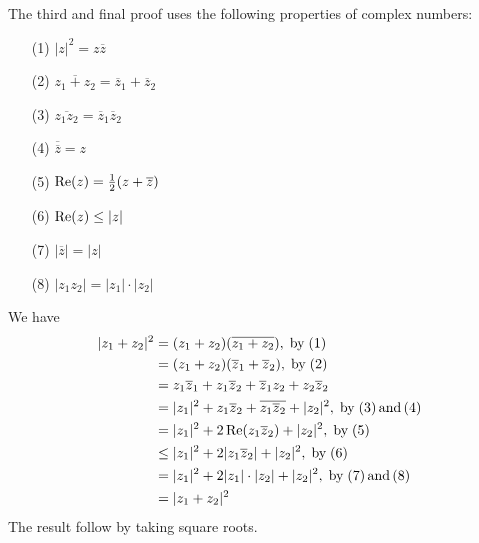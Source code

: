 \documentclass[handout]{ximera}
\begin{document}
The third and final proof uses the following properties of complex numbers:


\begin{itemize}
\item[(1)] $|z|^2 = z{\overline z} $
\item[(2)] ${\overline {z_1 + z_2}}= {\overline z_1} +{\overline z_2} $
\item[(3)] ${\overline{z_1z_2}} = {\overline z_1} {\overline z_2}$
\item[(4)] ${\overline {\overline z}} = z $
\item[(5)]  $\operatorname{Re}(z) = \frac12 (z+{\overline z}) $
\item[(6)]  $\operatorname{Re}(z) \leq |z| $
\item[(7)] $|{\overline z}| = |z|$ 
\item[(8)] $|z_1z_2| = |z_1|\cdot |z_2|$
\end{itemize}

We have
\begin{align*}
|z_1 + z_2|^2 &= (z_1 + z_2)({\overline {z_1 + z_2}}), \; \mbox{by} \;  (1)\\
              &= (z_1 + z_2)({\overline z_1} +{\overline z_2}), \; \mbox{by} \; (2)\\
              &= z_1{\overline z_1} + z_1{\overline z_2}+ {\overline z_1}z_2 + z_2{\overline z_2} \\
              &= |z_1|^2 + z_1{\overline z_2} + {\overline {z_1{\overline z_2}}} + |z_2|^2 ,\; \mbox{by} \;(3) \, \mbox{and} \, (4)\\
              &= |z_1|^2 + 2\operatorname{Re}(z_1{\overline z_2}) + |z_2|^2, \; \mbox{by} \; (5)  \\
              & \leq |z_1|^2 + 2 |z_1{\overline z_2}| + |z_2|^2, \; \mbox{by} \;(6)\\
              &= |z_1|^2 + 2 |z_1| \cdot |z_2| + |z_2|^2, \; \mbox{by} \;(7) \, \mbox{and} \, (8)\\
              &= |z_1 + z_2|^2
\end{align*}
The result follow by taking square roots.
\end{document}
